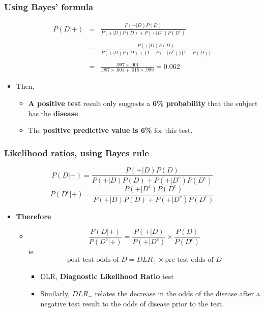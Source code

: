 \documentclass[10pt,article]{article}
\begin{document}
\subsubsection{Using Bayes' formula}
\label{sec:org719da94}
\begin{eqnarray*}
P(D | +) & = &\frac{P(+|D)P(D)}{P(+|D)P(D) + P(+|D^c)P(D^c)}\\ \\
& = & \frac{P(+|D)P(D)}{P(+|D)P(D) + \{1-P(-|D^c)\}\{1 - P(D)\}} \\ \\
& = & \frac{.997\times .001}{.997 \times .001 + .015 \times .999} = 0.062
\end{eqnarray*}

\begin{itemize}
\item Then,
\begin{itemize}
\item \textbf{A positive test} result only suggests a \textbf{6\% probability} that the subject has the \textbf{disease}.
\item The \textbf{positive predictive value is 6\%} for this test.
\end{itemize}
\end{itemize}
\subsubsection{Likelihood ratios, using Bayes rule}
\label{sec:org7c8266e}
$$
  P(D|+) = \frac{P(+|D)P(D)}{P(+|D)P(D) + P(+|D^c)P(D^c)}
  $$
$$P(D^c|+) = \frac{P(+|D^c)P(D^c)}{P(+|D)P(D) + P(+|D^c)P(D^c)}$$
\begin{itemize}
\item \textbf{Therefore}
\begin{itemize}
\item $$\frac{P(D|+)}{P(D^c|+)} = \frac{P(+|D)}{P(+|D^c)}\times \frac{P(D)}{P(D^c)}$$
ie $$\mbox{post-test odds of }D = DLR_+\times\mbox{pre-test odds of }D$$
\begin{itemize}
\item DLR, \textbf{Diagnostic Likelihood Ratio} test
\item Similarly, \(DLR_-\) relates the decrease in the odds of the disease after a negative test result to the odds of disease prior to the test.
\end{itemize}
\end{itemize}
\end{itemize}
\end{document}
